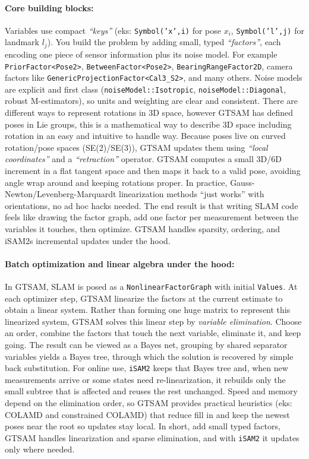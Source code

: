 \paragraph{Core building blocks:}
Variables use compact \textit{``keys''} (eks: \texttt{Symbol('x',i)} for pose $x_i$, \texttt{Symbol('l',j)} for landmark $l_j$). You build the problem by adding small, typed \textit{``factors''}, each encoding one piece of sensor information plus its noise model. For example \texttt{PriorFactor<Pose2>}, \texttt{BetweenFactor<Pose2>}, \texttt{BearingRangeFactor2D}, camera factors like \texttt{GenericProjectionFactor<Cal3\_S2>}, and many others. Noise models are explicit and first class (\texttt{noiseModel::Isotropic}, \texttt{noiseModel::Diagonal}, robust M-estimators), so units and weighting are clear and consistent. There are different ways to represent rotations in 3D space, however GTSAM has defined poses in Lie groups, this is a mathematical way to describe 3D space including rotation in an easy and intuitive to handle way. Because poses live on curved rotation/pose spaces (SE(2)/SE(3)), GTSAM updates them using \textit{``local coordinates''} and a \textit{``retraction''} operator. GTSAM computes a small 3D/6D increment in a flat tangent space and then maps it back to a valid pose, avoiding angle wrap around and keeping rotations proper. In practice, Gauss-Newton/Levenberg-Marquardt linearization methods ``just works'' with orientations, no ad hoc hacks needed. The end result is that writing SLAM code feels like drawing the factor graph, add one factor per measurement between the variables it touches, then optimize. GTSAM handles sparsity, ordering, and iSAM2s incremental updates under the hood. \cite{GTSAM_handbook}

\paragraph{Batch optimization and linear algebra under the hood:}
In GTSAM, SLAM is posed as a \texttt{NonlinearFactorGraph} with initial \texttt{Values}. At each optimizer step, GTSAM linearize the factors at the current estimate to obtain a linear system. Rather than forming one huge matrix to represent this linearized system, GTSAM solves this linear step by \emph{variable elimination}. Choose an order, combine the factors that touch the next variable, eliminate it, and keep going. The result can be viewed as a Bayes net, grouping by shared separator variables yields a Bayes tree, through which the solution is recovered by simple back substitution. For online use, \texttt{iSAM2} keeps that Bayes tree and, when new measurements arrive or some states need re-linearization, it rebuilds only the small subtree that is affected and reuses the rest unchanged. Speed and memory depend on the elimination order, so GTSAM provides practical heuristics (eks: COLAMD and constrained COLAMD) that reduce fill in and keep the newest poses near the root so updates stay local. In short, add small typed factors, GTSAM handles linearization and sparse elimination, and with \texttt{iSAM2} it updates only where needed. \cite{GTSAM_handbook}

